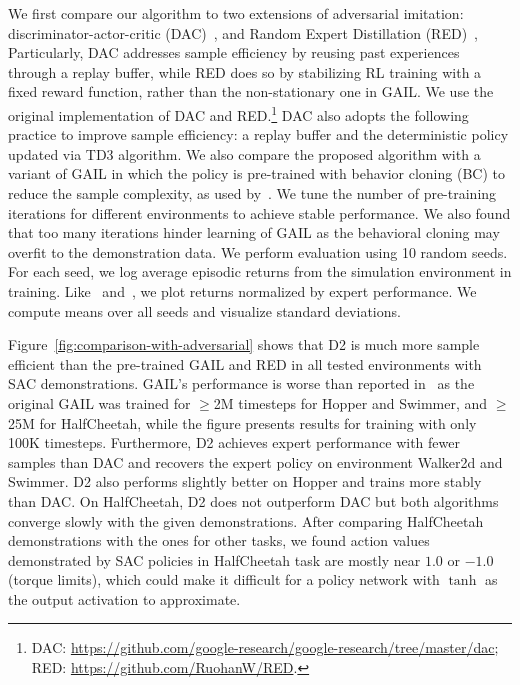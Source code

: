 \documentclass[letterpaper]{article} %
\begin{document}
We first compare our algorithm to two extensions of adversarial imitation: 
discriminator-actor-critic (DAC)~\cite{kostrikov2018discriminator}, 
and Random Expert Distillation (RED)~\cite{wang2019random}, 
Particularly, DAC addresses sample efficiency by reusing past experiences through a replay buffer, 
while RED does so by stabilizing RL training with a fixed reward function, 
rather than the non-stationary one in GAIL.
We use the original implementation of DAC and RED.\footnote{DAC: \url{https://github.com/google-research/google-research/tree/master/dac}; RED: \url{https://github.com/RuohanW/RED}.}
DAC also adopts the following practice to improve sample efficiency: 
a replay buffer and the deterministic policy updated via TD3 algorithm. 
We also compare the proposed algorithm with a variant of GAIL in which the policy is pre-trained with behavior cloning (BC) to reduce the sample complexity, as used by~\citet{ho2016generative}.
We tune the number of pre-training iterations for different environments to achieve stable performance. 
We also found that too many iterations hinder learning of GAIL as the behavioral cloning may  overfit to the demonstration data. 
We perform evaluation using 10 random seeds. 
For each seed, we log average episodic returns from the simulation environment in training. 
Like~\citet{ho2016generative} and~\citet{kostrikov2018discriminator}, we plot returns normalized by expert performance. 
We compute means over all seeds and visualize standard deviations. 


Figure~\ref{fig:comparison-with-adversarial}
shows that D2 is much more sample efficient than the pre-trained GAIL and RED in all tested environments with SAC demonstrations. 
GAIL's performance is worse than reported in~\cite{ho2016generative} as the original GAIL was trained for $\geq$2M timesteps for Hopper and Swimmer, and $\geq$25M for HalfCheetah, while the figure presents results for training with only 100K timesteps.
Furthermore, D2 achieves expert performance with fewer samples than DAC and recovers the expert policy on environment Walker2d and Swimmer. 
D2 also performs slightly better on Hopper and trains more stably than DAC. 
On HalfCheetah, D2 does not outperform DAC but both algorithms converge slowly with the given demonstrations. 
After comparing HalfCheetah demonstrations with the ones for other tasks, 
we found action values demonstrated by SAC policies in HalfCheetah task are mostly near $1.0$ or $-1.0$ (torque limits),
which could make it difficult for a policy network with $\tanh$ as the output activation to approximate. 
\end{document}
